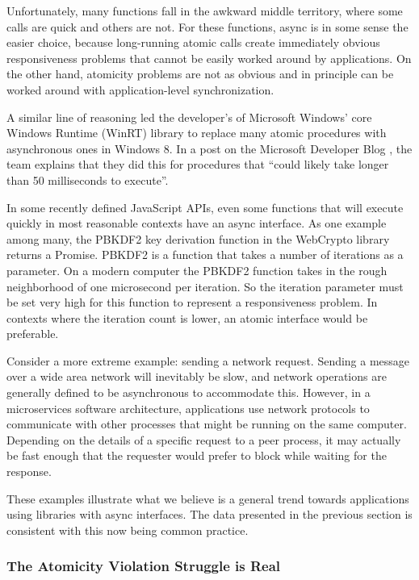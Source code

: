 \documentclass[acmsmall,anonymous,review]{acmart}\settopmatter{printfolios=true,printccs=false,printacmref=false}
\begin{document}
Unfortunately, many functions fall in the awkward middle territory, where some calls are quick and others are not.
For these functions, async is in some sense the easier choice, because long-running atomic calls create immediately obvious responsiveness problems that cannot be easily worked around by applications.
On the other hand, atomicity problems are not as obvious and in principle can be worked around with application-level synchronization.

A similar line of reasoning led the developer's of Microsoft Windows' core Windows Runtime (WinRT) library to replace many atomic procedures with asynchronous ones in Windows 8.
In a post on the Microsoft Developer Blog \cite{Windows8Team2012}, the team explains that they did this for procedures that ``could likely take longer than 50 milliseconds to execute''.

In some recently defined JavaScript APIs, even some functions that will execute quickly in most reasonable contexts have an async interface.
As one example among many, the PBKDF2 key derivation function in the WebCrypto library returns a Promise.
PBKDF2 is a function that takes a number of iterations as a parameter.
On a modern computer the PBKDF2 function takes in the rough neighborhood of one microsecond per iteration.
So the iteration parameter must be set very high for this function to represent a responsiveness problem.
In contexts where the iteration count is lower, an atomic interface would be preferable.

Consider a more extreme example: sending a network request.
Sending a message over a wide area network will inevitably be slow, and network operations are generally defined to be asynchronous to accommodate this.
However, in a microservices software architecture, applications use network protocols to communicate with other processes that might be running on the same computer.
Depending on the details of a specific request to a peer process, it may actually be fast enough that the requester would prefer to block while waiting for the response.

These examples illustrate what we believe is a general trend towards applications using libraries with async interfaces.
The data presented in the previous section is consistent with this now being common practice.


\subsubsection{The Atomicity Violation Struggle is Real}
\end{document}
